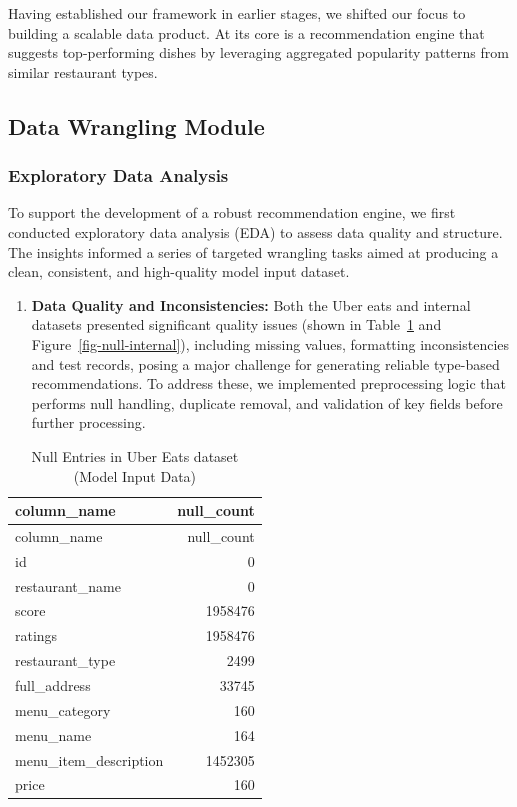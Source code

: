 \documentclass[
  11pt,
  a4paper,
  DIV=11,
  numbers=noendperiod]{scrartcl}
\providecommand{\tightlist}{%
  \setlength{\itemsep}{0pt}\setlength{\parskip}{0pt}}\usepackage{longtable,booktabs,array}
\begin{document}
Having established our framework in earlier stages, we shifted our focus
to building a scalable data product. At its core is a recommendation
engine that suggests top-performing dishes by leveraging aggregated
popularity patterns from similar restaurant types.

\subsection{Data Wrangling Module}\label{data-wrangling-module}

\subsubsection{Exploratory Data
Analysis}\label{exploratory-data-analysis}

To support the development of a robust recommendation engine, we first
conducted exploratory data analysis (EDA) to assess data quality and
structure. The insights informed a series of targeted wrangling tasks
aimed at producing a clean, consistent, and high-quality model input
dataset.

\begin{enumerate}
\def\labelenumi{\arabic{enumi}.}
\tightlist
\item
  \textbf{Data Quality and Inconsistencies:} Both the Uber eats and
  internal datasets presented significant quality issues (shown in
  Table~\ref{tbl-null-entries} and Figure~\ref{fig-null-internal}),
  including missing values, formatting inconsistencies and test records,
  posing a major challenge for generating reliable type-based
  recommendations. To address these, we implemented preprocessing logic
  that performs null handling, duplicate removal, and validation of key
  fields before further processing.
\end{enumerate}

\begin{longtable}[]{@{}lr@{}}
\caption{Null Entries in Uber Eats dataset (Model Input
Data)}\label{tbl-null-entries}\tabularnewline
\toprule\noalign{}
column\_name & null\_count \\
\midrule\noalign{}
\endfirsthead
\toprule\noalign{}
column\_name & null\_count \\
\midrule\noalign{}
\endhead
\bottomrule\noalign{}
\endlastfoot
id & 0 \\
restaurant\_name & 0 \\
score & 1958476 \\
ratings & 1958476 \\
restaurant\_type & 2499 \\
full\_address & 33745 \\
menu\_category & 160 \\
menu\_name & 164 \\
menu\_item\_description & 1452305 \\
price & 160 \\
\end{longtable}
\end{document}
